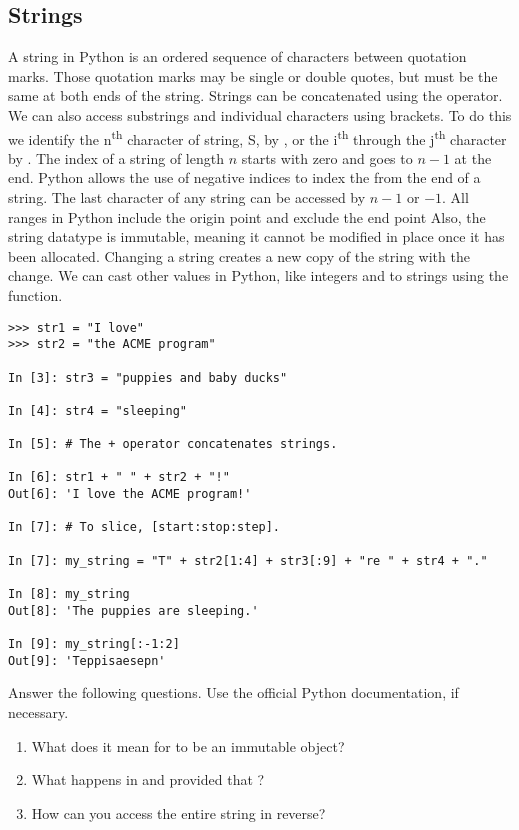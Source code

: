 \subsection*{Strings}
\begin{example}
A string in Python is an ordered sequence of characters 
between quotation marks. Those quotation marks may be single or double quotes, but must be the same at both ends of the string.
Strings can be concatenated using the \li{+} operator. We can also access substrings and individual characters using brackets. To do this we identify the n\textsuperscript{th} character of string, S, by , or the i\textsuperscript{th} through the j\textsuperscript{th} character by .
The index of a string of length $n$ starts with zero and goes to $n-1$ at the end.
Python allows the use of negative indices to index the from the end of a string.
The last character of any string can be accessed by $n-1$ or $-1$.
All ranges in Python include the origin point and exclude the end point
Also, the string datatype is immutable, meaning it cannot be modified in place once it has been allocated.
Changing a string creates a new copy of the string with the change.
We can cast other values in Python, like integers and  to strings using the  function.
\begin{lstlisting}
>>> str1 = "I love"
>>> str2 = "the ACME program"

In [3]: str3 = "puppies and baby ducks"

In [4]: str4 = "sleeping"

In [5]: # The + operator concatenates strings.

In [6]: str1 + " " + str2 + "!"
Out[6]: 'I love the ACME program!'

In [7]: # To slice, [start:stop:step].

In [7]: my_string = "T" + str2[1:4] + str3[:9] + "re " + str4 + "."

In [8]: my_string
Out[8]: 'The puppies are sleeping.'

In [9]: my_string[:-1:2]
Out[9]: 'Teppisaesepn'

\end{lstlisting}
\end{example}

\begin{problem}
Answer the following questions. Use the official Python documentation, if necessary.

\begin{enumerate}

\item What does it mean for  to be an immutable object? 
\item What happens in  and  provided 
that ? 
\item How can you access the entire string in reverse?

\end{enumerate}
\end{problem}

